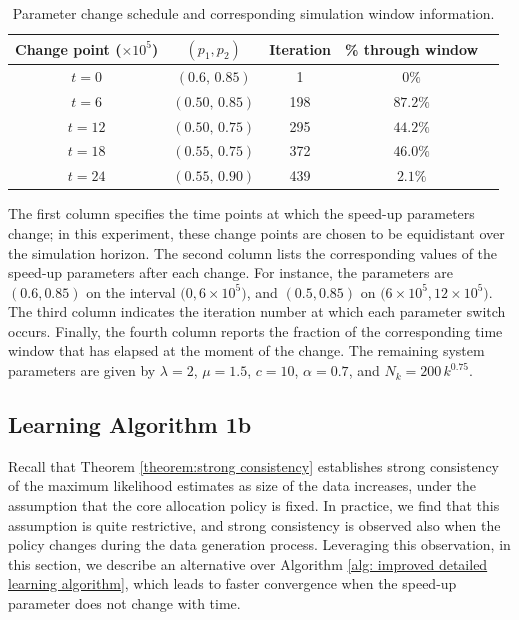 \documentclass[11pt]{article}
\theoremstyle{remark}
\theoremstyle{definition}
\numberwithin{equation}{section}
\begin{document}
 


\begin{table}[htbp]
\centering
\caption{Parameter change schedule and corresponding simulation window information.}
\label{tab:parameter_schedule}
\begin{tabular}{ccccc}
\hline
Change point ($\times 10^5$) & $(p_1,p_2)$ & Iteration & \% through window \\
\hline

$t = 0$
& $(0.6,\,0.85)$
& 1
& $0\%$ \\

$t = 6$ 
& $(0.50,\,0.85)$ 
& 198 
& $87.2\%$ \\

$t = 12$ 
& $(0.50,\,0.75)$ 
& 295 
& $44.2\%$ \\

$t = 18$ 
& $(0.55,\,0.75)$ 
& 372 
& $46.0\%$ \\

$t = 24$ 
& $(0.55,\,0.90)$ 
& 439 
& $2.1\%$ \\

\hline
\end{tabular}
\end{table}

The first column specifies the time points at which the speed-up parameters change; in this experiment, these change points are chosen to be equidistant over the simulation horizon. The second column lists the corresponding values of the speed-up parameters after each change. For instance, the parameters are $(0.6, 0.85)$ on the interval $\big(0, 6\times10^5\big)$, and $(0.5, 0.85)$ on $\big(6\times10^5, 12\times10^5\big)$. The third column indicates the iteration number at which each parameter switch occurs. Finally, the fourth column reports the fraction of the corresponding time window that has elapsed at the moment of the change.
The remaining system parameters are given by $\lambda = 2$, $\mu = 1.5$, $c = 10$, $\alpha = 0.7$, and $N_k = 200\, k^{0.75}$.




\subsection{Learning Algorithm 1b} \label{subsection: algorithm 2}

Recall that Theorem \ref{theorem:strong consistency} establishes strong consistency of the maximum likelihood estimates as size of the data increases, under the assumption that the core allocation policy is fixed.
In practice, we find that this assumption is quite restrictive, and strong consistency is observed also when the policy changes during the data generation process.
Leveraging this observation, in this section, we describe an alternative over Algorithm \ref{alg: improved detailed learning algorithm}, which leads to faster convergence when the speed-up parameter does not change with time.
\end{document}
